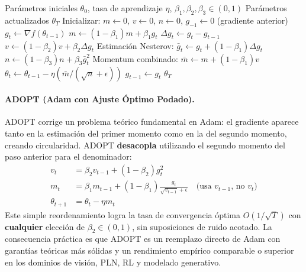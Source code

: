 \begin{algorithm}[H]
\caption{Adan (Momentum Nesterov Adaptativo)}
\label{alg:adan}
\begin{algorithmic}[1]
\Require Parámetros iniciales $\theta_0$, tasa de aprendizaje $\eta$, $\beta_1, \beta_2, \beta_3 \in (0,1)$
\Ensure Parámetros actualizados $\theta_T$
\State Inicializar: $m \gets 0$, $v \gets 0$, $n \gets 0$, $g_{-1} \gets 0$ (gradiente anterior)
    \State $g_t \gets \nabla f(\theta_{t-1})$
    \State $m \gets (1-\beta_1) m + \beta_1 g_t$
    \State $\Delta g_t \gets g_t - g_{t-1}$
    \State $v \gets (1-\beta_2) v + \beta_2 \Delta g_t$
    \State Estimación Nesterov: $\bar{g}_t \gets g_t + (1-\beta_1) \Delta g_t$
    \State $n \gets (1-\beta_3) n + \beta_3 \bar{g}_t^2$
    \State Momentum combinado: $\bar{m} \gets m + (1-\beta_1) v$
    \State $\theta_t \gets \theta_{t-1} - \eta (\bar{m} / (\sqrt{n} + \epsilon))$
    \State $g_{t-1} \gets g_t$
\EndFor
\Return $\theta_T$
\end{algorithmic}
\end{algorithm}

\paragraph{ADOPT (Adam con Ajuste Óptimo Podado).}
ADOPT corrige un problema teórico fundamental en Adam: el gradiente aparece tanto en la estimación del primer momento como en la del segundo momento, creando circularidad. ADOPT \textbf{desacopla} utilizando el segundo momento del paso anterior para el denominador:
\begin{align}
v_t &= \beta_2 v_{t-1} + (1-\beta_2)g_t^2 \\
m_t &= \beta_1 m_{t-1} + (1-\beta_1)\frac{g_t}{\sqrt{v_{t-1}}+\epsilon} \quad\text{(usa $v_{t-1}$, no $v_t$)} \\
\theta_{t+1} &= \theta_t - \eta m_t
\end{align}
Este simple reordenamiento logra la tasa de convergencia óptima $O(1/\sqrt{T})$ con \textbf{cualquier} elección de $\beta_2 \in (0,1)$, sin suposiciones de ruido acotado. La consecuencia práctica es que ADOPT es un reemplazo directo de Adam con garantías teóricas más sólidas y un rendimiento empírico comparable o superior en los dominios de visión, PLN, RL y modelado generativo.

